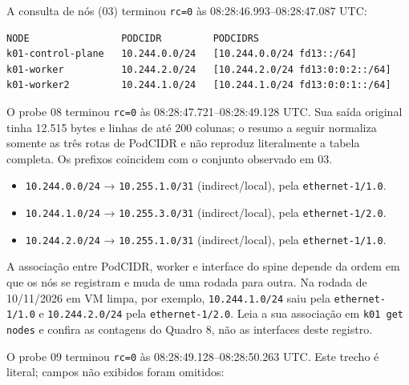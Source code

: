 \documentclass[12pt,openany,oneside,a4paper,chapter=TITLE,english,brazil]{abntex2}
\providecommand{\tightlist}{\setlength{\itemsep}{0pt}\setlength{\parskip}{0pt}}
\begin{document}
A consulta de nós (03) terminou \texttt{rc=\allowbreak{}0} às 08:28:46.993--08:28:47.087 UTC:

\begin{verbatim}
NODE                PODCIDR         PODCIDRS
k01-control-plane   10.244.0.0/24   [10.244.0.0/24 fd13::/64]
k01-worker          10.244.2.0/24   [10.244.2.0/24 fd13:0:0:2::/64]
k01-worker2         10.244.1.0/24   [10.244.1.0/24 fd13:0:0:1::/64]
\end{verbatim}

O probe 08 terminou \texttt{rc=\allowbreak{}0} às 08:28:47.721--08:28:49.128 UTC. Sua saída
original tinha 12.515 bytes e linhas de até 200 colunas; o resumo a seguir
normaliza somente as três rotas de PodCIDR e não reproduz literalmente a tabela
completa. Os prefixos coincidem com o conjunto observado em 03.

\begin{itemize}
\tightlist
\item
  \texttt{10.\allowbreak{}244.\allowbreak{}0.\allowbreak{}0/\allowbreak{}24} → \texttt{10.\allowbreak{}255.\allowbreak{}1.\allowbreak{}0/\allowbreak{}31} (indirect/local), pela
  \texttt{ethernet-{}\allowbreak{}1/\allowbreak{}1.\allowbreak{}0}.
\item
  \texttt{10.\allowbreak{}244.\allowbreak{}1.\allowbreak{}0/\allowbreak{}24} → \texttt{10.\allowbreak{}255.\allowbreak{}3.\allowbreak{}0/\allowbreak{}31} (indirect/local), pela
  \texttt{ethernet-{}\allowbreak{}1/\allowbreak{}2.\allowbreak{}0}.
\item
  \texttt{10.\allowbreak{}244.\allowbreak{}2.\allowbreak{}0/\allowbreak{}24} → \texttt{10.\allowbreak{}255.\allowbreak{}1.\allowbreak{}0/\allowbreak{}31} (indirect/local), pela
  \texttt{ethernet-{}\allowbreak{}1/\allowbreak{}1.\allowbreak{}0}.
\end{itemize}

A associação entre PodCIDR, worker e interface do spine depende da ordem em que
os nós se registram e muda de uma rodada para outra. Na rodada de 10/11/2026 em
VM limpa, por exemplo, \texttt{10.\allowbreak{}244.\allowbreak{}1.\allowbreak{}0/\allowbreak{}24} saiu pela \texttt{ethernet-{}\allowbreak{}1/\allowbreak{}1.\allowbreak{}0} e
\texttt{10.\allowbreak{}244.\allowbreak{}2.\allowbreak{}0/\allowbreak{}24} pela \texttt{ethernet-{}\allowbreak{}1/\allowbreak{}2.\allowbreak{}0}. Leia a sua associação em \texttt{k01 get nodes}
e confira as contagens do Quadro 8, não as interfaces deste registro.

O probe 09 terminou \texttt{rc=\allowbreak{}0} às 08:28:49.128--08:28:50.263 UTC. Este trecho é
literal; campos não exibidos foram omitidos:
\end{document}
